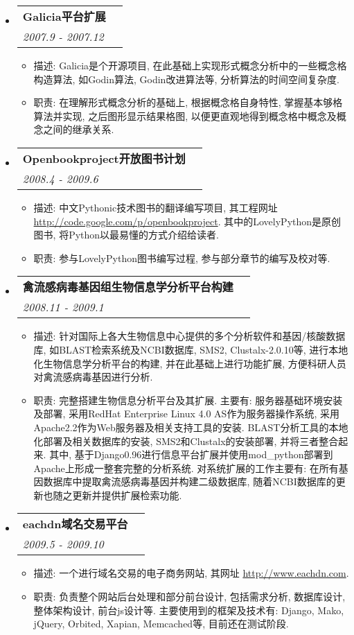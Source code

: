 \documentclass[letterpaper,11pt]{article}
\makeatletter
\newcommand{\resitem}[1]{\item #1 \vspace{-2pt}}
\newcommand{\resheading}[1]{{\large \parashade[.9]{sharpcorners}{\textbf{#1 \vphantom{p\^{E}}}}}}
\newcommand{\ressubheading}[4]{
\begin{tabular*}{6.5in}{l@{\extracolsep{\fill}}r}
        \textbf{#1} & #2 \\
        \textit{#3} & \textit{#4} \\
\end{tabular*}\vspace{-2pt}}
\makeatother
\begin{document}
\resheading{项目经历}
\begin{itemize}

\item
    \ressubheading{Galicia平台扩展}{}{2007.9 - 2007.12}{}
    \begin{itemize}
        \resitem{   描述: Galicia是个开源项目, 在此基础上实现形式概念分析中的一些概念格构造算法, 如Godin算法, Godin改进算法等, 分析算法的时间空间复杂度.}
        \resitem{   职责: 在理解形式概念分析的基础上, 根据概念格自身特性, 掌握基本够格算法并实现, 之后图形显示结果格图, 以便更直观地得到概念格中概念及概念之间的继承关系.}
    \end{itemize}

\item
    \ressubheading{Openbookproject开放图书计划}{}{2008.4 - 2009.6}{}
    \begin{itemize}
        \resitem{   描述: 中文Pythonic技术图书的翻译编写项目, 其工程网址 \href{http://code.google.com/p/openbookproject/}{http://code.google.com/p/openbookproject}. 其中的LovelyPython是原创图书, 将Python以最易懂的方式介绍给读者.}
        \resitem{   职责: 参与LovelyPython图书编写过程, 参与部分章节的编写及校对等.}
    \end{itemize}

\item
    \ressubheading{禽流感病毒基因组生物信息学分析平台构建}{}{2008.11 - 2009.1}{}
    \begin{itemize}
        \resitem{   描述: 针对国际上各大生物信息中心提供的多个分析软件和基因/核酸数据库, 如BLAST检索系统及NCBI数据库, SMS2, Clustalx-2.0.10等, 进行本地化生物信息学分析平台的构建, 并在此基础上进行功能扩展, 方便科研人员对禽流感病毒基因进行分析.}
        \resitem{   职责: 完整搭建生物信息分析平台及其扩展. 主要有: 服务器基础环境安装及部署, 采用RedHat Enterprise Linux 4.0 AS作为服务器操作系统, 采用Apache2.2作为Web服务器及相关支持工具的安装. BLAST分析工具的本地化部署及相关数据库的安装, SMS2和Clustalx的安装部署, 并将三者整合起来. 其中, 基于Django0.96进行信息平台扩展并使用mod\_python部署到Apache上形成一整套完整的分析系统. 对系统扩展的工作主要有: 在所有基因数据库中提取禽流感病毒基因并构建二级数据库, 随着NCBI数据库的更新也随之更新并提供扩展检索功能.}
    \end{itemize}

\item
    \ressubheading{eachdn域名交易平台}{}{2009.5 - 2009.10}{}
    \begin{itemize}
        \resitem{   描述: 一个进行域名交易的电子商务网站, 其网址 \href{http://www.eachdn.com/}{http://www.eachdn.com}. }
        \resitem{   职责: 负责整个网站后台处理和部分前台设计, 包括需求分析, 数据库设计, 整体架构设计, 前台js设计等. 主要使用到的框架及技术有: Django, Mako, jQuery, Orbited, Xapian, Memcached等, 目前还在测试阶段.}
    \end{itemize}


\end{itemize}
\end{document}
